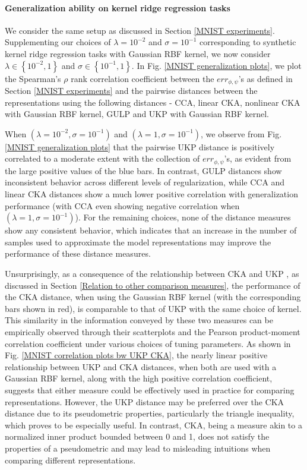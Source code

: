 \documentclass{article}
\theoremstyle{plain}
\newcommand{\repone}{\phi}
\newcommand{\reptwo}{\psi}
\newcommand{\metricstname}{UKP }
\begin{document}
\raggedbottom


\paragraph{Generalization ability on kernel ridge regression tasks}

We consider the same setup as discussed in Section \ref{MNIST experiments}. Supplementing our choices of $\lambda=10^{-2}$ and $\sigma=10^{-1}$ corresponding to synthetic kernel ridge regression tasks with Gaussian RBF kernel, we now consider $\lambda \in \left\{10^{-2},1\right\}$  and $\sigma \in \left\{10^{-1},1\right\}$. In Fig. \ref{MNIST generalization plots}, we plot the Spearman's $\rho$ rank correlation coefficient between the $err_{\repone,\reptwo}$'s as defined in Section \ref{MNIST experiments} and the pairwise distances between the representations using the following distances - CCA, linear CKA, nonlinear CKA with Gaussian RBF kernel, GULP and UKP with Gaussian RBF kernel. 

When $(\lambda = 10^{-2},\sigma = 10^{-1})$ and $(\lambda=1,\sigma=10^{-1})$, we observe from Fig. \ref{MNIST generalization plots} that the pairwise \metricstname distance is positively correlated to a moderate extent with the collection of $err_{\repone,\reptwo}$'s, as evident from the large positive values of the blue bars. In contrast, GULP distances show inconsistent behavior across different levels of regularization, while CCA and linear CKA distances show a much lower positive correlation with generalization performance (with CCA even showing negative correlation when $(\lambda=1,\sigma=10^{-1})$). For the remaining choices, none of the distance measures show any consistent behavior, which indicates that an increase in the number of samples used to approximate the model representations may improve the performance of these distance measures.

Unsurprisingly, as a consequence of the relationship between CKA and \metricstname, as discussed in Section \ref{Relation to other comparison measures}, the performance of the CKA distance, when using the Gaussian RBF kernel (with the corresponding bars shown in red), is comparable to that of \metricstname with the same choice of kernel. This similarity in the information conveyed by these two measures can be empirically observed through their scatterplots and the Pearson product-moment correlation coefficient under various choices of tuning parameters. As shown in Fig. \ref{MNIST correlation plots bw UKP CKA}, the nearly linear positive relationship between \metricstname and CKA distances, when both are used with a Gaussian RBF kernel, along with the high positive correlation coefficient, suggests that either measure could be effectively used in practice for comparing representations. However, the \metricstname distance may be preferred over the CKA distance due to its pseudometric properties, particularly the triangle inequality, which proves to be especially useful. In contrast, CKA, being a measure akin to a normalized inner product bounded between 0 and 1, does not satisfy the properties of a pseudometric and may lead to misleading intuitions when comparing different representations.
\raggedbottom
\end{document}
